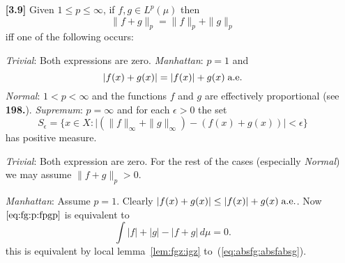 \begin{enumerate}
\begin{itemize}
 \item[\textbf{[3.9]}]
  Given \(1\leq p \leq \infty\),
  if \(f,g\in L^p(\mu)\)
  then
  \begin{equation} \label{eq:fg:p:fpgp}
      \|f + g\|_p = \|f\|_p + \|g\|_p
  \end{equation}
  iff one of the following occurs:
   \begin{itemize}
    \itemdim \emph{Trivial}:  Both expressions are zero.
    \itemdim \emph{Manhattan}: \(p=1\) and
             \begin{equation} \label{eq:absfg:absfabsg}
              |f(x)+g(x)| = |f(x)| + g(x)\;\textrm{a.e.}
             \end{equation}
    \itemdim \emph{Normal}: \(1< p <\infty\) and the functions
          $f$ and $g$ are effectively proportional
          (see \cite{Hardy:1952:I} \textbf{198.}).
    \itemdim \emph{Supremum}: \(p=\infty\) and for each \(\epsilon>0\)
          the set
          \begin{equation*}
           S_\epsilon =
               \bigl\{x\in X:
              \bigl|\left(\|f\|_\infty + \|g\|_\infty\right) - (f(x)+g(x))\bigr|
               < \epsilon\bigr\}
          \end{equation*}
          has positive measure.
   \end{itemize}
    \emph{Trivial}: Both expression are zero. For the rest of the cases
       (especially \emph{Normal}) we may assume \(\|f+g\|_p > 0\).

    \medskip
    \emph{Manhattan}:
    Assume \(p=1\).
    Clearly  \(|f(x)+g(x)| \leq |f(x)| + g(x)\;\textrm{a.e.}\).
    Now \(\ref{eq:fg:p:fpgp}\) is equivalent to
    \begin{equation*}
    \int  |f| + |g| - |f+g|\,d\mu = 0.
    \end{equation*}
    this is equivalent by local lemma~\ref{lem:fgz:igz}
    to~(\ref{eq:absfg:absfabsg}).


\end{itemize}
\end{enumerate}
